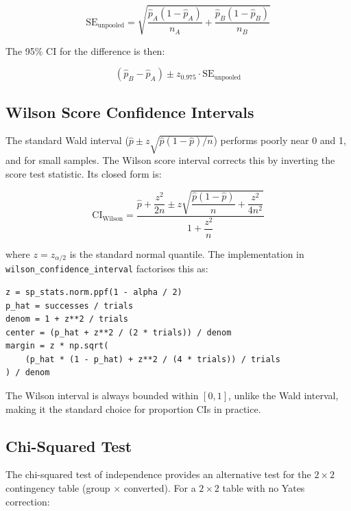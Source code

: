 \begin{equation}
  \mathrm{SE}_{\mathrm{unpooled}} = \sqrt{
    \frac{\hat{p}_A(1-\hat{p}_A)}{n_A} +
    \frac{\hat{p}_B(1-\hat{p}_B)}{n_B}
  }
  \label{eq:se-unpool}
\end{equation}

The 95\% CI for the difference is then:

\begin{equation}
  \left(\hat{p}_B - \hat{p}_A\right) \pm z_{0.975} \cdot
  \mathrm{SE}_{\mathrm{unpooled}}
\end{equation}

\subsection{Wilson Score Confidence Intervals}

The standard Wald interval ($\hat{p} \pm z \sqrt{\hat{p}(1-\hat{p})/n}$)
performs poorly near 0 and 1, and for small samples. The Wilson score interval
corrects this by inverting the score test statistic. Its closed form is:

\begin{equation}
  \mathrm{CI}_{\mathrm{Wilson}} =
  \frac{\hat{p} + \dfrac{z^2}{2n} \pm
    z\sqrt{\dfrac{\hat{p}(1-\hat{p})}{n} + \dfrac{z^2}{4n^2}}}
  {1 + \dfrac{z^2}{n}}
  \label{eq:wilson}
\end{equation}

where $z = z_{\alpha/2}$ is the standard normal quantile. The implementation
in \texttt{wilson\_confidence\_interval} factorises this as:

\begin{lstlisting}[style=python, caption={Wilson CI (stats\_engine.py lines 95--100)}]
z = sp_stats.norm.ppf(1 - alpha / 2)
p_hat = successes / trials
denom = 1 + z**2 / trials
center = (p_hat + z**2 / (2 * trials)) / denom
margin = z * np.sqrt(
    (p_hat * (1 - p_hat) + z**2 / (4 * trials)) / trials
) / denom
\end{lstlisting}

The Wilson interval is always bounded within $[0,1]$, unlike the Wald interval,
making it the standard choice for proportion CIs in practice.

\subsection{Chi-Squared Test}

The chi-squared test of independence provides an alternative test for the
$2 \times 2$ contingency table (group $\times$ converted). For a $2 \times 2$
table with no Yates correction:


